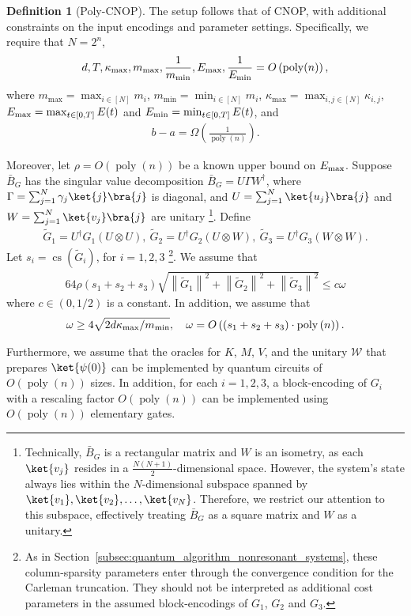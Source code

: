 \documentclass[superscriptaddress,onecolumn,nofootinbib,longbibliography,a4paper,accepted=2026-09-29]{quantumarticle}
\theoremstyle{plain}
\theoremstyle{definition}
\newtheorem{definition}[thm]{Definition}
\numberwithin{thm}{section}
\numberwithin{assumption}{section}
\numberwithin{lemma}{section}
\numberwithin{prop}{section}
\numberwithin{cor}{section}
\numberwithin{definition}{section}
\numberwithin{rmk}{section}
\numberwithin{equation}{section}
\newcommand{\norm}[1]     {\left\| #1 \right\|}
\newcommand{\lrb}[1]{\left ( #1 \right )}
\newcommand{\mypoly}[1]{\operatorname{poly} \lrb{#1}}
\newcommand{\myO}[1]{O\lrb{#1}}
\newcommand{\myOmega}[1]{\Omega\lrb{#1}}
\begin{document}
\begin{definition}[Poly-CNOP]
The setup follows that of CNOP, with additional constraints on the input encodings and parameter settings. Specifically, we require that $N=2^n$,  
\begin{align}
d, T, \kappa_{\max}, m_{\max}, \frac{1}{m_{\min}}, E_{\rm max}, \frac{1}{E_{\rm min}} = \myO{\operatorname{poly}(n)}, 
\end{align}
where $m_{\max} = \max_{i \in [N]} m_i$, $m_{\min} = \min_{i \in [N]} m_i$, $\kappa_{\max} = \max_{i,j \in [N]} \kappa_{i,j}$, $E_{\rm max}=\max_{t \in [0, T]} E(t)$
and
$E_{\rm min}=\min_{t \in [0, T]} E(t)$, and
\begin{align}
b - a = \myOmega{\frac{1}{\operatorname{poly}(n)}}.    
\end{align}
 
Moreover, let $\rho=\myO{\mypoly{n}}$ be a known upper bound on $E_{\rm max}$. Suppose $\bar{B}_G$ has the singular value decomposition $\bar{B}_G=U \Gamma W^\dagger$, where $\Gamma=\sum_{j=1}^N \gamma_j \ket{j}\bra{j}$ is diagonal, and $U=\sum_{j=1}^N \ket{u_j}\bra{j}$ and $W=\sum_{j=1}^{N} \ket{v_j}\bra{j}$ are unitary \footnote{Technically, $\bar{B}_G$ is a rectangular matrix and $W$ is an isometry, as each $\ket{v_j}$ resides in a $\frac{N(N+1)}{2}$-dimensional space. However, the system's state always lies within the $N$-dimensional subspace spanned by $\ket{v_1}, \ket{v_2}, \dots, \ket{v_N}$. Therefore, we restrict our attention to this subspace, effectively treating $\bar{B}_G$ as a square matrix and $W$ as a unitary.}. Define
\begin{align}
\tilde{G}_1=U^\dagger G_1 (U \otimes U),~
\tilde{G}_2=U^\dagger G_2 (U \otimes W),~
\tilde{G}_3=U^\dagger G_3 (W \otimes W).
\end{align}
Let $s_i=\operatorname{cs}(\tilde{G}_i)$, for $i=1,2,3$ \footnote{As in Section~\ref{subsec:quantum_algorithm_nonresonant_systems}, these column-sparsity parameters enter through the convergence condition for the Carleman truncation. They should not be interpreted as additional cost parameters in the assumed block-encodings of $G_1$, $G_2$ and $G_3$.}. We assume that
\begin{align}
    64 \rho (s_1+s_2+s_3)\sqrt{\norm{\tilde{G}_1}^2+\norm{\tilde{G}_2}^2+\norm{\tilde{G}_3}^2}\le c \omega
\end{align}
where $c \in (0,1/2)$ is a constant. In addition, we assume that 
\begin{align}
\omega \ge 4\sqrt{2d\kappa_{\rm max}/m_{\rm min}}, \quad \omega = \myO{(s_1+s_2+s_3) \cdot\mypoly{n}}.
\end{align}


Furthermore, we assume that the oracles for $K$, $M$, $V$, and the unitary $\mathcal{W}$ that prepares $\ket{\psi(0)}$ can be implemented by quantum circuits of $\myO{\operatorname{poly}(n)}$ sizes. In addition, for each $i=1,2,3$, 
a block-encoding of $G_i$ with a rescaling factor $\myO{\mypoly{n}}$ can be implemented using $\myO{\mypoly{n}}$ elementary gates. 

\end{definition}
\end{document}

